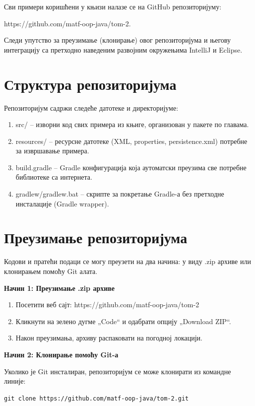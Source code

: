 Сви примери коришћени у књизи налазе се на GitHub репозиторијуму:

https://github.com/matf-oop-java/tom-2.

Следи упутство за преузимање (клонирање) овог репозиторијума и његову интеграцију са претходно наведеним развојним окружењима IntelliJ и Eclipse.

\section{Структура репозиторијума}

Репозиторијум садржи следеће датотеке и директоријуме:

\begin{enumerate}
\item src/ – изворни код свих примера из књиге, организован у пакете по главама.
\item resources/ – ресурсне датотеке (XML, properties, persistence.xml) потребне за извршавање примера.
\item build.gradle – Gradle конфигурација која аутоматски преузима све потребне библиотеке са интернета.
\item gradlew/gradlew.bat – скрипте за покретање Gradle-а без претходне инсталације (Gradle wrapper).
\end{enumerate}
\section{Преузимање репозиторијума}

Кодови и пратећи подаци се могу преузети на два начина: у виду .zip архиве или клонирањем помоћу Git алата.

\textbf{Начин 1: Преузимање .zip архиве}

\begin{enumerate}
\item Посетити веб сајт: https://github.com/matf-oop-java/tom-2
\item Кликнути на зелено дугме „Code“ и одабрати опцију „Download ZIP“.
\item Након преузимања, архиву распаковати на погодној локацији.
\end{enumerate}
\textbf{Начин 2: Клонирање помоћу Git-а}

Уколико је Git инсталиран, репозиторијум се може клонирати из командне линије:

\begin{center}\texttt{git clone https://github.com/matf-oop-java/tom-2.git}\end{center}

